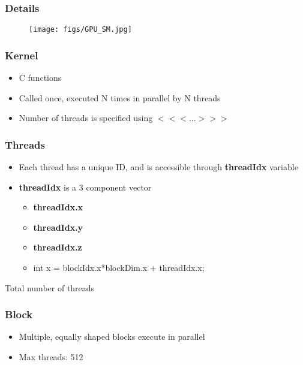 \begin{frame}\frametitle{Details}\logoEvolution\mypagenum
\end{frame}


\begin{frame}[plain]
	\begin{changemargin}{-1.3in}{0in}
		\begin{figure}
			\texttt{[image: figs/GPU\_SM.jpg]}
		\end{figure}
	\end{changemargin}
\end{frame}




\begin{frame}\frametitle{Kernel}\logoEvolution\mypagenum
	\begin{itemize}
		\item C functions
		\item Called once, executed N times in parallel by N threads
		\item Number of threads is specified using $<<<...>>>$
	\end{itemize}
\end{frame}


\begin{frame}\frametitle{Threads}\logoEvolution\mypagenum
	\begin{itemize}
		\item Each thread has a unique ID, and is accessible through \textbf{threadIdx} variable
		\item \textbf{threadIdx} is a 3 component vector
		\begin{itemize}
			\item \textbf{threadIdx.x}
			\item \textbf{threadIdx.y}
			\item \textbf{threadIdx.z}
			\item int x = blockIdx.x*blockDim.x + threadIdx.x;
		\end{itemize}
	\end{itemize}
	\begin{block}{Total number of threads}
	\end{block}
\end{frame}




\begin{frame}\frametitle{Block}\logoEvolution\mypagenum
	\begin{itemize}
		\item Multiple, equally shaped blocks execute in parallel
		\item Max threads: 512
	\end{itemize}
\end{frame}




